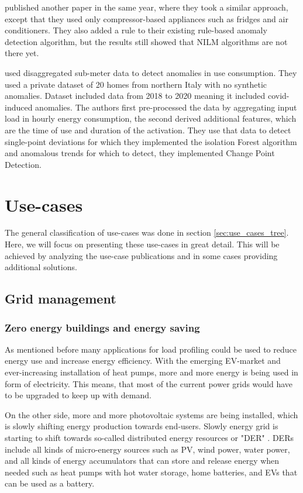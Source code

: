 \cite{NILMAD22019} published another paper in the same year, where they took a similar approach, except that they used 
only compressor-based appliances such as fridges and air conditioners. They also added a rule to their existing rule-based anomaly 
detection algorithm, but the results still showed that NILM algorithms are not there yet. 

\cite{Castangia2021} used disaggregated sub-meter data to detect anomalies in use consumption.
They used a private dataset of 20 homes from northern Italy with no synthetic anomalies. 
Dataset included data from 2018 to 2020 meaning it included covid-induced anomalies. 
The authors first pre-processed the data by aggregating input load in hourly energy consumption, 
the second derived additional features, which are the time of use and duration of the activation.
They use that data to detect single-point deviations for which they implemented the isolation Forest algorithm and
anomalous trends for which to detect, they implemented Change Point Detection. 

\section{Use-cases}
\label{sec:use-cases}

The general classification of use-cases was done in section \ref{sec:use_cases_tree}. 
Here, we will focus on presenting these use-cases in great detail.
This will be achieved by analyzing the use-case publications and in some cases providing additional solutions.

\subsection{Grid management}

\subsubsection{Zero energy buildings and energy saving}

As mentioned before many applications for load profiling could be used to reduce energy use and increase energy efficiency. 
With the emerging EV-market and ever-increasing installation of heat pumps, more and more energy is being used in form of electricity. 
This means, that most of the current power grids would have to be upgraded to keep up with demand.

On the other side, more and more photovoltaic systems are being installed,
which is slowly shifting energy production towards end-users.
Slowly energy grid is starting to shift towards so-called distributed energy resources or "DER" \cite{MORENOJARAMILLO2021445}.
DERs include all kinds of micro-energy sources such as PV, wind power, water power, and all kinds of energy accumulators that can store 
and release energy when needed such as heat pumps with hot water storage, home batteries, and EVs that can be used as a battery.


